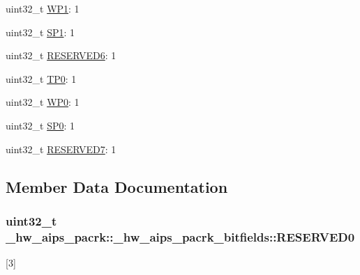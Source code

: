 \begin{DoxyCompactItemize}
\item 
uint32\+\_\+t \hyperlink{struct__hw__aips__pacrk_1_1__hw__aips__pacrk__bitfields_a3b8c49d9e6d0b754d14ba9106daefe03}{W\+P1}\+: 1
\item 
uint32\+\_\+t \hyperlink{struct__hw__aips__pacrk_1_1__hw__aips__pacrk__bitfields_afdba84d62a8b84d89970fd0ada72a3fd}{S\+P1}\+: 1
\item 
uint32\+\_\+t \hyperlink{struct__hw__aips__pacrk_1_1__hw__aips__pacrk__bitfields_ac368d8367f28f36c22b26257292fd9df}{R\+E\+S\+E\+R\+V\+E\+D6}\+: 1
\item 
uint32\+\_\+t \hyperlink{struct__hw__aips__pacrk_1_1__hw__aips__pacrk__bitfields_af281d8e31f76b70726fa7d80690e66ed}{T\+P0}\+: 1
\item 
uint32\+\_\+t \hyperlink{struct__hw__aips__pacrk_1_1__hw__aips__pacrk__bitfields_afd59e74620a380f3e258e7de9124117e}{W\+P0}\+: 1
\item 
uint32\+\_\+t \hyperlink{struct__hw__aips__pacrk_1_1__hw__aips__pacrk__bitfields_a04457cc0ec88ca0ac246ad9b40385d25}{S\+P0}\+: 1
\item 
uint32\+\_\+t \hyperlink{struct__hw__aips__pacrk_1_1__hw__aips__pacrk__bitfields_ad1840f6c096cc11a72164322d777e3fa}{R\+E\+S\+E\+R\+V\+E\+D7}\+: 1
\end{DoxyCompactItemize}


\subsection{Member Data Documentation}
\subsubsection[{\texorpdfstring{R\+E\+S\+E\+R\+V\+E\+D0}{RESERVED0}}]{\setlength{\rightskip}{0pt plus 5cm}uint32\+\_\+t \+\_\+hw\+\_\+aips\+\_\+pacrk\+::\+\_\+hw\+\_\+aips\+\_\+pacrk\+\_\+bitfields\+::\+R\+E\+S\+E\+R\+V\+E\+D0}\hypertarget{struct__hw__aips__pacrk_1_1__hw__aips__pacrk__bitfields_a2aafb422a917c81ce990050d002d4644}{}\label{struct__hw__aips__pacrk_1_1__hw__aips__pacrk__bitfields_a2aafb422a917c81ce990050d002d4644}
\mbox{[}3\mbox{]} 

